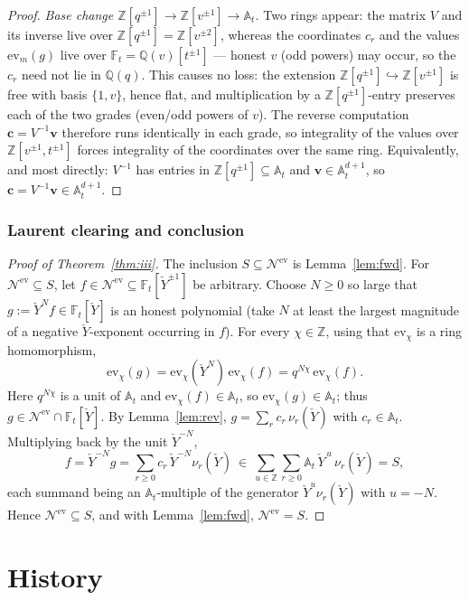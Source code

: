 \documentclass[11pt]{article}
\newcommand{\At}{\mathbb{A}_t}
\newcommand{\Ft}{\mathbb{F}_t}
\newcommand{\Nev}{\mathcal N^{\mathrm{ev}}}
\newcommand{\Yc}{\check Y}
\newcommand{\Z}{\mathbb Z}
\newcommand{\ev}{\mathrm{ev}}
\begin{document}
\begin{proof}
\smallskip
\emph{Base change $\Z[q^{\pm1}]\to\Z[v^{\pm1}]\to\At$.}\;
Two rings appear: the matrix $V$ and its inverse live over
$\Z[q^{\pm1}]=\Z[v^{\pm2}]$, whereas the coordinates $c_r$ and the values
$\ev_m(g)$ live over $\Ft=\mathbb Q(v)[t^{\pm1}]$ --- honest $v$ (odd powers) may
occur, so the $c_r$ need not lie in $\mathbb Q(q)$. This causes no loss: the
extension $\Z[q^{\pm1}]\hookrightarrow\Z[v^{\pm1}]$ is free with basis
$\{1,v\}$, hence flat, and multiplication by a $\Z[q^{\pm1}]$-entry preserves
each of the two grades (even/odd powers of $v$). The reverse computation
$\mathbf c=V^{-1}\mathbf v$ therefore runs identically in each grade, so
integrality of the values over $\Z[v^{\pm1},t^{\pm1}]$ forces integrality of the
coordinates over the same ring. Equivalently, and most directly:
$V^{-1}$ has entries in $\Z[q^{\pm1}]\subseteq\At$ and $\mathbf v\in\At^{d+1}$,
so $\mathbf c=V^{-1}\mathbf v\in\At^{d+1}$.
\end{proof}

\subsubsection{Laurent clearing and conclusion}

\begin{proof}[Proof of Theorem~\ref{thm:iii}]
The inclusion $S\subseteq\Nev$ is Lemma~\ref{lem:fwd}. For $\Nev\subseteq S$,
let $f\in\Nev\subseteq\Ft[\Yc^{\pm1}]$ be arbitrary. Choose $N\ge0$ so large that
$g:=\Yc^{N}f\in\Ft[\Yc]$ is an honest polynomial (take $N$ at least the largest
magnitude of a negative $\Yc$-exponent occurring in $f$). For every $\chi\in\Z$,
using that $\ev_\chi$ is a ring homomorphism,
\[
  \ev_\chi(g)=\ev_\chi(\Yc^{N})\,\ev_\chi(f)=q^{N\chi}\,\ev_\chi(f).
\]
Here $q^{N\chi}$ is a unit of $\At$ and $\ev_\chi(f)\in\At$, so
$\ev_\chi(g)\in\At$; thus $g\in\Nev\cap\Ft[\Yc]$. By Lemma~\ref{lem:rev},
$g=\sum_{r}c_r\,\nu_r(\Yc)$ with $c_r\in\At$. Multiplying back by the unit
$\Yc^{-N}$,
\[
  f=\Yc^{-N}g=\sum_{r\ge0}c_r\,\Yc^{-N}\nu_r(\Yc)
   \ \in\ \sum_{u\in\Z}\sum_{r\ge0}\At\,\Yc^{\,u}\,\nu_r(\Yc)=S,
\]
each summand being an $\At$-multiple of the generator $\Yc^{u}\nu_r(\Yc)$ with
$u=-N$. Hence $\Nev\subseteq S$, and with Lemma~\ref{lem:fwd}, $\Nev=S$.
\end{proof}

\section{History}
\end{document}
